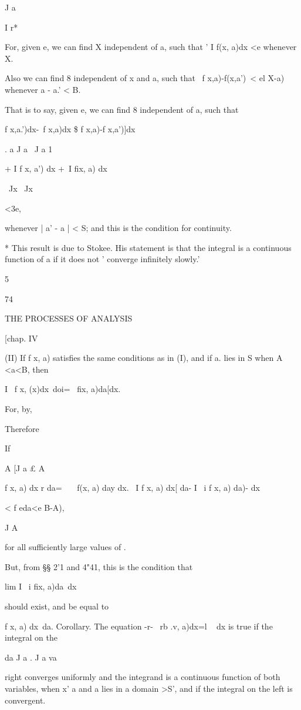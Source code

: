 J a

I r*

For, given e, we can find X independent of a, such that ' I f(x, a)dx
<e whenever X.

Also we can find 8 independent of x and a, such that \ f x,a)-f(x,a')\
< el X-a) whenever a - a.' < B.

That is to say, given e, we can find 8 independent of a, such that

f x,a.')dx-\ f x,a)dx \$ f x,a)-f x,a')]dx\

. a J a \ J a 1

+ I f x, a') dx +\ I fix, a) dx

\ Jx \ Jx

<3e,

whenever | a' - a | < S; and this is the condition for continuity.

* This result is due to Stokee. His statement is that the integral is
a continuous function of a if it does not ' converge infinitely
slowly.'

5

74

THE PROCESSES OF ANALYSIS

[chap. IV

(II) If f x, a) satisfies the same conditions as in (I), and if a.
lies in S when A <a<B, then

I \ f x, (x)dx\ doi= \ fix, a)da[dx.

For, by,

Therefore

If

A [J a £ A

f x, a) dx r da= \ \ \ f(x, a) day dx. \ I f x, a) dx[ da- I \ i f x,
a) da)- dx

< f eda<e B-A),

J A

for all sufficiently large values of .

But, from §§ 2'1 and 4"41, this is the condition that

lim I \ i fix, a)da\ dx

should exist, and be equal to

f x, a) dx\ da. Corollary. The equation -r- \ rb .v, a)dx=l ~ dx is
true if the integral on the

da J a . J a va

right converges uniformly and the integrand is a continuous function
of both variables, when x' a and a lies in a domain >S', and if the
integral on the left is convergent.

